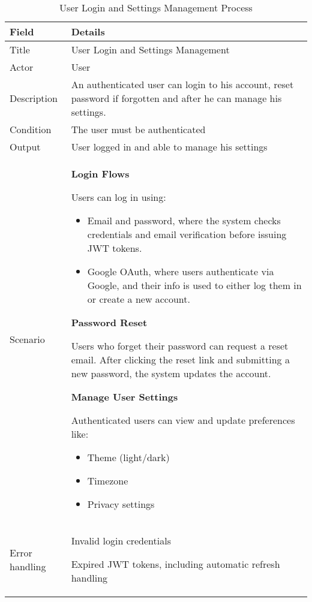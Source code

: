 \begin{table}[h]
\centering
\begin{tabular}{|p{3cm}|p{11cm}|}
\hline
\textbf{Field} & \textbf{Details} \\
\hline
Title & User Login and Settings Management \\
\hline
Actor & User \\
\hline
Description & An authenticated user can login to his account, reset password if forgotten and after he can manage his settings. \\
\hline
Condition & The user must be authenticated \\
\hline
Output & User logged in and able to manage his settings \\
\hline
Scenario & \textbf{Login Flows}
\vspace{0.2cm}


Users can log in using:
\begin{itemize}
\item Email and password, where the system checks credentials and email verification before issuing JWT tokens.
\item Google OAuth, where users authenticate via Google, and their info is used to either log them in or create a new account.
\end{itemize}

\textbf{Password Reset}
\vspace{0.2cm}

Users who forget their password can request a reset email. After clicking the reset link and submitting a new password, the system updates the account.

\textbf{Manage User Settings}
\vspace{0.2cm}

Authenticated users can view and update preferences like:
\begin{itemize}
\item Theme (light/dark)
\item Timezone
\item Privacy settings
\end{itemize} \\
\hline
Error handling & Invalid login credentials

Expired JWT tokens, including automatic refresh handling \\
\hline
\end{tabular}
\caption{User Login and Settings Management Process}
\label{tab:login_settings}
\end{table}





